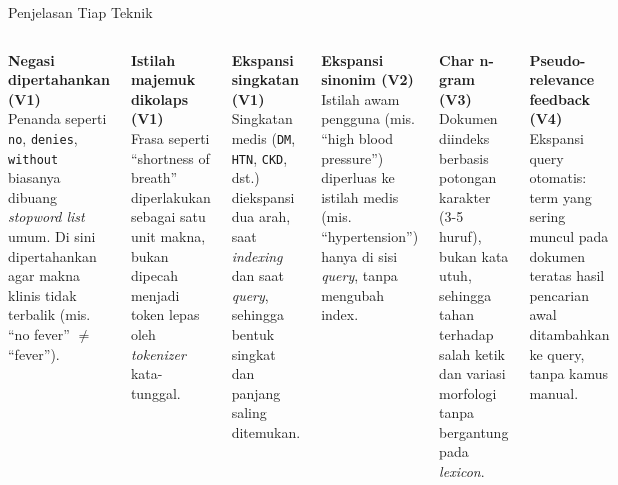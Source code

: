 \documentclass[aspectratio=169,10pt]{beamer}
\begin{document}
\begin{frame}{Penjelasan Tiap Teknik}
  \small
  \begin{columns}[T,onlytextwidth]
    \textbf{\color{ugmBlueDark}Negasi dipertahankan (V1)}\\
    \scriptsize
    Penanda seperti \texttt{no}, \texttt{denies}, \texttt{without} biasanya dibuang \textit{stopword list} umum. Di sini dipertahankan agar makna klinis tidak terbalik (mis. ``no fever'' $\neq$ ``fever'').

    \vspace{0.35cm}
    \normalsize
    \textbf{\color{ugmBlueDark}Istilah majemuk dikolaps (V1)}\\
    \scriptsize
    Frasa seperti ``shortness of breath'' diperlakukan sebagai satu unit makna, bukan dipecah menjadi token lepas oleh \textit{tokenizer} kata-tunggal.

    \vspace{0.35cm}
    \normalsize
    \textbf{\color{ugmBlueDark}Ekspansi singkatan (V1)}\\
    \scriptsize
    Singkatan medis (\texttt{DM}, \texttt{HTN}, \texttt{CKD}, dst.) diekspansi dua arah, saat \textit{indexing} dan saat \textit{query}, sehingga bentuk singkat dan panjang saling ditemukan.

    \textbf{\color{ugmBlueDark}Ekspansi sinonim (V2)}\\
    \scriptsize
    Istilah awam pengguna (mis. ``high blood pressure'') diperluas ke istilah medis (mis. ``hypertension'') hanya di sisi \textit{query}, tanpa mengubah index.

    \vspace{0.35cm}
    \normalsize
    \textbf{\color{ugmBlueDark}Char n-gram (V3)}\\
    \scriptsize
    Dokumen diindeks berbasis potongan karakter (3-5 huruf), bukan kata utuh, sehingga tahan terhadap salah ketik dan variasi morfologi tanpa bergantung pada \textit{lexicon}.

    \vspace{0.35cm}
    \normalsize
    \textbf{\color{ugmBlueDark}Pseudo-relevance feedback (V4)}\\
    \scriptsize
    Ekspansi query otomatis: term yang sering muncul pada dokumen teratas hasil pencarian awal ditambahkan ke query, tanpa kamus manual.
  \end{columns}
\end{frame}

\end{document}
